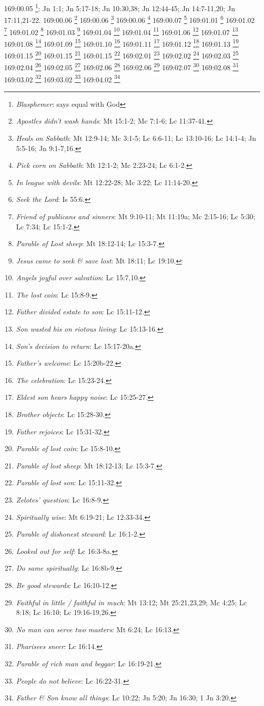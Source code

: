 {{{{{{{{{{{{{{{{{{{{{{{{{{{{{{{{{{{{{{{{{{{{{{{{{{{{169:00.05 \footnote{\textit{Blasphemer}: says equal with God}: Jn 1:1; Jn 5:17-18; Jn 10:30,38; Jn 12:44-45; Jn 14:7-11,20; Jn 17:11,21-22.}
169:00.06 \footnote{\textit{Apostles didn't wash hands}: Mt 15:1-2; Mc 7:1-6; Lc 11:37-41.}
169:00.06 \footnote{\textit{Heals on Sabbath}: Mt 12:9-14; Mc 3:1-5; Lc 6:6-11; Lc 13:10-16; Lc 14:1-4; Jn 5:5-16; Jn 9:1-7,16.}
169:00.06 \footnote{\textit{Pick corn on Sabbath}: Mt 12:1-2; Mc 2:23-24; Lc 6:1-2.}
169:00.07 \footnote{\textit{In league with devils}: Mt 12:22-28; Mc 3:22; Lc 11:14-20.}
169:01.01 \footnote{\textit{Seek the Lord}: Is 55:6.}
169:01.02 \footnote{\textit{Friend of publicans and sinners}: Mt 9:10-11; Mt 11:19a; Mc 2:15-16; Lc 5:30; Lc 7:34; Lc 15:1-2.}
169:01.02 \footnote{\textit{Parable of Lost sheep}: Mt 18:12-14; Lc 15:3-7.}
169:01.03 \footnote{\textit{Jesus came to seek & save lost}: Mt 18:11; Lc 19:10.}
169:01.04 \footnote{\textit{Angels joyful over salvation}: Lc 15:7,10.}
169:01.04 \footnote{\textit{The lost coin}: Lc 15:8-9.}
169:01.06 \footnote{\textit{Father divided estate to son}: Lc 15:11-12.}
169:01.07 \footnote{\textit{Son wasted his on riotous living}: Lc 15:13-16.}
169:01.08 \footnote{\textit{Son's decision to return}: Lc 15:17-20a.}
169:01.09 \footnote{\textit{Father's welcome}: Lc 15:20b-22.}
169:01.10 \footnote{\textit{The celebration}: Lc 15:23-24.}
169:01.11 \footnote{\textit{Eldest son hears happy noise}: Lc 15:25-27.}
169:01.12 \footnote{\textit{Brother objects}: Lc 15:28-30.}
169:01.13 \footnote{\textit{Father rejoices}: Lc 15:31-32.}
169:01.15 \footnote{\textit{Parable of lost coin}: Lc 15:8-10.}
169:01.15 \footnote{\textit{Parable of lost sheep}: Mt 18:12-13; Lc 15:3-7.}
169:01.15 \footnote{\textit{Parable of lost son}: Lc 15:11-32.}
169:02.01 \footnote{\textit{Zelotes' question}: Lc 16:8-9.}
169:02.02 \footnote{\textit{Spiritually wise}: Mt 6:19-21; Lc 12:33-34.}
169:02.03 \footnote{\textit{Parable of dishonest steward}: Lc 16:1-2.}
169:02.04 \footnote{\textit{Looked out for self}: Lc 16:3-8a.}
169:02.05 \footnote{\textit{Do same spiritually}: Lc 16:8b-9.}
169:02.06 \footnote{\textit{Be good stewards}: Lc 16:10-12.}
169:02.06 \footnote{\textit{Faithful in little / faithful in much}: Mt 13:12; Mt 25:21,23,29; Mc 4:25; Lc 8:18; Lc 16:10; Lc 19:16-19,26.}
169:02.07 \footnote{\textit{No man can serve two masters}: Mt 6:24; Lc 16:13.}
169:02.08 \footnote{\textit{Pharisees sneer}: Lc 16:14.}
169:03.02 \footnote{\textit{Parable of rich man and beggar}: Lc 16:19-21.}
169:03.02 \footnote{\textit{People do not believe}: Lc 16:22-31.}
169:04.02 \footnote{\textit{Father & Son know all things}: Lc 10:22; Jn 5:20; Jn 16:30; 1 Jn 3:20.}
}}}}}}}}}}}}}}}}}}}}}}}}}}}}}}}}}}}}}}}}}}}}}}}}}}}
